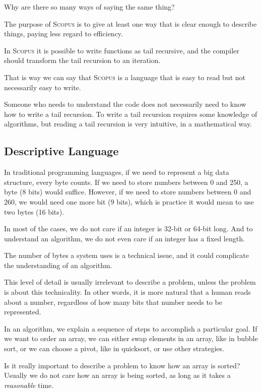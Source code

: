 \documentclass[12pt,a4paper]{article}
\newcommand{\Scopus}{\textsc{Scopus}\xspace}
\begin{document}
    Why are there so many ways of saying the same thing?

    The purpose of \Scopus is to give at least one way that is clear enough to describe things, paying less regard to efficiency.

    In \Scopus it is possible to write functions as tail recursive, and the compiler should transform the tail recursion to an iteration.

    That is way we can say that \Scopus is a language that is easy to read but not necessarily easy to write.

    Someone who needs to understand the code does not necessarily need to know how to write a tail recursion.
    To write a tail recursion requires some knowledge of algorithms, but reading a tail recursion is very intuitive, in a mathematical way.

    \subsection{Descriptive Language}

    In traditional programming languages, if we need to represent a big data structure, every byte counts.
    If we need to store numbers between 0 and 250, a byte (8 bits) would suffice.
    However, if we need to store numbers between 0 and 260, we would need one more bit (9 bits), which is practice it would mean to use two bytes (16 bits).

    In most of the cases, we do not care if an integer is 32-bit or 64-bit long.
    And to understand an algorithm, we do not even care if an integer has a fixed length.

    The number of bytes a system uses is a technical issue, and it could complicate the understanding of an algorithm.

    This level of detail is usually irrelevant to describe a problem, unless the problem is about this technicality.
    In other words, it is more natural that a human reads about a number, regardless of how many bits that number needs to be represented.

    In an algorithm, we explain a sequence of steps to accomplish a particular goal.
    If we want to order an array, we can either swap elements in an array, like in bubble sort, or we can choose a pivot, like in quicksort, or use other strategies.

    Is it really important to describe a problem to know how an array is sorted?
    Usually we do not care how an array is being sorted, as long as it takes a \textit{reasonable} time.
\end{document}
